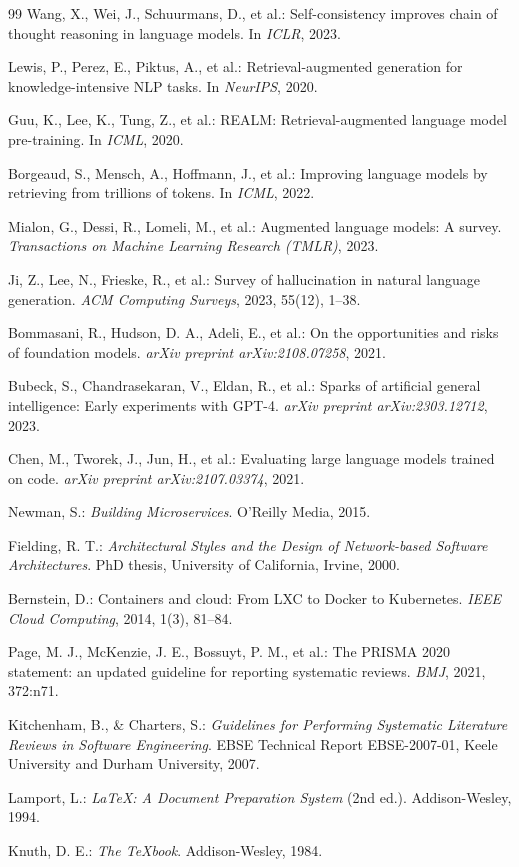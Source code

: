 \documentclass[12pt, a4paper]{article}
\begin{document}
\begin{thebibliography}{99}
Wang, X., Wei, J., Schuurmans, D., et al.: Self-consistency improves chain of thought
reasoning in language models. In \textit{ICLR}, 2023.

Lewis, P., Perez, E., Piktus, A., et al.: Retrieval-augmented generation for
knowledge-intensive NLP tasks. In \textit{NeurIPS}, 2020.

Guu, K., Lee, K., Tung, Z., et al.: REALM: Retrieval-augmented language model
pre-training. In \textit{ICML}, 2020.

Borgeaud, S., Mensch, A., Hoffmann, J., et al.: Improving language models by
retrieving from trillions of tokens. In \textit{ICML}, 2022.

Mialon, G., Dessi, R., Lomeli, M., et al.: Augmented language models: A survey.
\textit{Transactions on Machine Learning Research (TMLR)}, 2023.

Ji, Z., Lee, N., Frieske, R., et al.: Survey of hallucination in natural language
generation. \textit{ACM Computing Surveys}, 2023, 55(12), 1--38.

Bommasani, R., Hudson, D. A., Adeli, E., et al.: On the opportunities and risks of
foundation models. \textit{arXiv preprint arXiv:2108.07258}, 2021.

Bubeck, S., Chandrasekaran, V., Eldan, R., et al.: Sparks of artificial general
intelligence: Early experiments with GPT-4. \textit{arXiv preprint arXiv:2303.12712},
2023.

Chen, M., Tworek, J., Jun, H., et al.: Evaluating large language models trained on
code. \textit{arXiv preprint arXiv:2107.03374}, 2021.

Newman, S.: \textit{Building Microservices}. O'Reilly Media, 2015.

Fielding, R. T.: \textit{Architectural Styles and the Design of Network-based
Software Architectures}. PhD thesis, University of California, Irvine, 2000.

Bernstein, D.: Containers and cloud: From LXC to Docker to Kubernetes.
\textit{IEEE Cloud Computing}, 2014, 1(3), 81--84.

Page, M. J., McKenzie, J. E., Bossuyt, P. M., et al.: The PRISMA 2020 statement:
an updated guideline for reporting systematic reviews.
\textit{BMJ}, 2021, 372:n71.

Kitchenham, B., \& Charters, S.: \textit{Guidelines for Performing Systematic
Literature Reviews in Software Engineering}. EBSE Technical Report EBSE-2007-01,
Keele University and Durham University, 2007.

Lamport, L.: \textit{LaTeX: A Document Preparation System} (2nd ed.).
Addison-Wesley, 1994.

Knuth, D. E.: \textit{The TeXbook}. Addison-Wesley, 1984.

\end{thebibliography}
\end{document}
